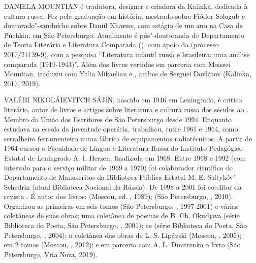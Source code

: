 \noindent{}DANIELA MOUNTIAN é tradutora, designer e criadora da Kalinka, de­dicada
à cultura russa. Fez pela  graduação em história, mestrado sobre
Fiódor Sologub e doutorado"-sanduíche sobre Daniil Kharms, com estágio de
um ano na Casa de Púchkin, em São Petersburgo. Atualmente é
pós"-doutoranda do Departamento de Teoria Literária e Literatura
Comparada (), com apoio da  (processo 2017/24139-9), com a pesquisa “Literatura infantil
russa e brasileira: uma análise comparada (1919-1943)”. Além dos livros
vertidos em parceria com Moissei Mountian, traduziu com Yulia Mikaelian
{} e {}, ambos de Serguei Dovlátov
(Kalinka, 2017, 2019).


\medskip

\noindent{}VALÉRI NIKOLÁIEVITCH SÁJIN, nascido em 1946 em Leningrado, é crítico
literário, autor de livros e artigos sobre literatura e cultura russa
dos séculos  ao .
Membro da União dos Escritores de São
Petersburgo desde 1994. Enquanto estudava na escola da juventude
operária, trabalhou, entre 1961 e 1964, como serralheiro ferramenteiro
numa fábrica de equipamentos radiotécnicos. A partir de 1964 cursou a
Faculdade de Língua e Literatura Russa do Instituto Pedagógico Estatal
de Leningrado A. I. Herzen, finalizada em 1968. Entre 1968 e 1992 (com
intervalo para o serviço militar de 1969 a 1970) foi colaborador
científico do Departamento de Manuscritos da Biblioteca Pública Estatal
M. E. Saltykóv"-Schedrin (atual Biblioteca Nacional da Rússia). De 1998 a
2001 foi coeditor da revista {}. É autor dos livros: {} (Moscou, ed.
{}, 1989); {} (São Petersburgo, {}, 2010). Organizou as
primeiras {} em seis tomos (São
Petersburgo, {}, 1997-2001) e várias
coletâneas de suas obras; uma coletânea de poemas de B. Ch. Okudjava
(série Biblioteca do Poeta, São Petersburgo, {}, 2001); as {} (série
Biblioteca do Poeta, São Petersburgo, {},
2004); a coletânea das obras de L. S. Lipávski {}
(Moscou, {}, 2005); {} em
2 tomos (Moscou, {}, 2012); e em
parceria com A. L. Dmitrenko o livro {} (São Petersburgo,
Vita Nova, 2019).

